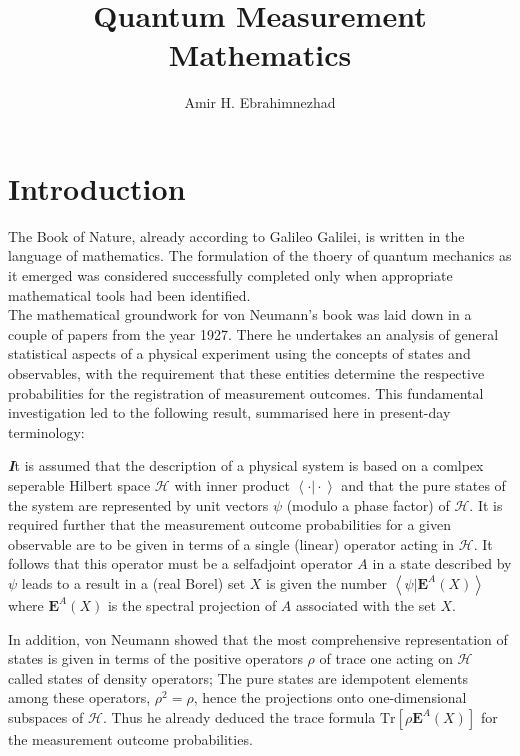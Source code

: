 \documentclass[10pt]{article}
\title{Quantum Measurement \\ \large Mathematics}
\author{Amir H. Ebrahimnezhad}
\newenvironment{callout}
	{\begin{calloutbox}\color{charcoal}\textbf\textit}
	{\end{calloutbox}}
\newcommand{\hamil}{\mathcal{H}}
\newcommand{\braket}[2]{\left\langle#1\vert#2 \right\rangle}
\newcommand{\specproj}[2]{\textbf{E}^{#1}(#2)}
\newcommand{\trace}[1]{\text{Tr}\left[#1\right]}
\begin{document}
    \maketitle
    \tableofcontents
    \section{Introduction}
    \indent The Book of Nature, already according to Galileo Galilei, is written in the language of mathematics. The formulation of the thoery of quantum mechanics as it emerged was considered successfully completed only when appropriate mathematical tools had been identified.
    \\
    \indent The mathematical groundwork for von Neumann's book was laid down in a couple of papers from the year 1927. There he undertakes an analysis of general statistical aspects of a physical experiment using the concepts of states and observables, with the requirement that these entities determine the respective probabilities for the registration of measurement outcomes. This fundamental investigation led to the following result, summarised here in present-day terminology:
     
    \begin{callout}
        It is assumed that the description of a physical system is based on a comlpex seperable Hilbert space $\hamil$ with inner product $\braket{\cdot}{\cdot}$ and that the pure states of the system are represented by unit vectors $\psi$ (modulo a phase factor) of $\hamil$. It is required further that the measurement outcome probabilities for a given observable are to be given in terms of a single (linear) operator acting in $\hamil$. It follows that this operator must be a selfadjoint operator $A$ in a state described by $\psi$ leads to a result in a (real Borel) set $X$ is given the number $\braket{\psi}{\specproj{A}{X}}$ where $\specproj{A}{X}$ is the spectral projection of $A$ associated with the set $X$.
    \end{callout}
     
    \indent In addition, von Neumann showed that the most comprehensive representation of states is given in terms of the positive operators $\rho$ of trace one acting on $\hamil$ called states of density operators; The pure states are idempotent elements among these operators, $\rho^2=\rho$, hence the projections onto one-dimensional subspaces of $\hamil$. Thus he already deduced the trace formula $\trace{\rho\specproj{A}{X}}$ for the measurement outcome probabilities.
\end{document}
